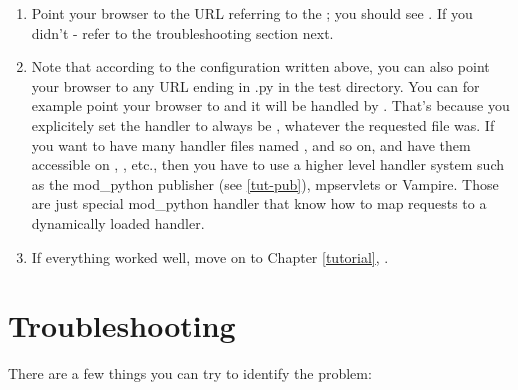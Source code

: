 \begin{enumerate}
\item
  Point your browser to the URL referring to the ;
  you should see . If you didn't - refer to the
  troubleshooting section next.

\item
  Note that according to the configuration written above, you can
  also point your browser to any URL ending in .py in the test directory.
  You can for example point your browser to 
  and it will be handled by . That's because you
  explicitely set the handler to always be , whatever the
  requested file was. If you want to have many handler files named
  , 
  and so on, and have them accessible on ,
  , etc., then you have to use a higher level
  handler system such as the mod_python publisher (see \ref{tut-pub}),
  mpservlets or Vampire. Those are just special mod_python handler
  that know how to map requests to a dynamically loaded handler.

\item
  If everything worked well, move on to Chapter \ref{tutorial}, 
  . 

\end{enumerate}

\begin{seealso}
\end{seealso}

\section{Troubleshooting\label{inst-trouble}}

There are a few things you can try to identify the problem: 

